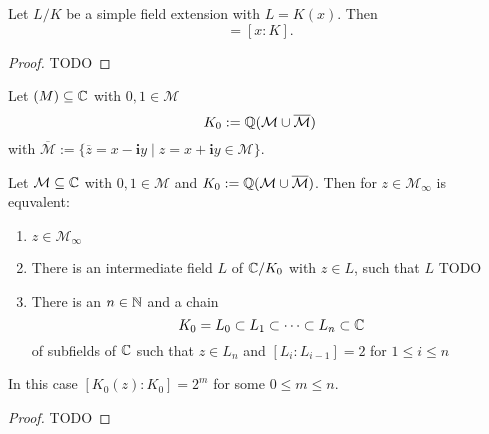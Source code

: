 \documentclass{../Proof_layout_PDF/TemplateExercise}
\begin{document}
\begin{theorem}
\label{thm:degree_of_simple_field_extension}
    Let $L/K$ be a simple field extension with $L = K(x)$. Then
    \begin{equation*}
        [L:K] = [x:K].
    \end{equation*}
\end{theorem}
\begin{proof}
    TODO %
\end{proof}
\begin{definition}
    Let $\mathcal(M)\subseteq\mathbb{C}$ with $0,1 \in \mathcal{M}$
    \begin{equation*}
        K_0 := \mathbb{Q}(\mathcal{M}\cup \overline{\mathcal{M}})
    \end{equation*}
    with $\overline{\mathcal{M}} := \{ \overline{z} = x - \textbf{i}y \mid z = x+\textbf{i}y  \in \mathcal{M} \}$.
\end{definition}
\begin{theorem}
\label{thm:degree_of_constructable_points}
    Let $\mathcal{M}\subseteq\mathbb{C}$ with $0,1 \in \mathcal{M}$ and $K_0 := \mathbb{Q}(\mathcal{M}\cup \overline{\mathcal{M}})$.
    Then for $z \in \mathcal{M}_{\infty}$ is equvalent:
    \begin{enumerate}
        \item $z \in \mathcal{M}_{\infty}$
        \item There is an intermediate field $L$ of $\mathbb{C}/K_0$ with $z \in L$, such that $L$
        TODO %
        \item There is an $n \in \mathbb{N}$ and a chain \begin{equation*}
            K_0 = L_0 \subset L_1 \subset \dots \subset L_n \subset \mathbb{C}
        \end{equation*}
        of subfields of $\mathbb{C}$ such that $z \in L_n$ and $[L_i:L_{i-1}] =2$ for $1\le i\le n$ %
    \end{enumerate}
    In this case $[K_0(z):K_0] = 2^m$ for some $0 \le m \le n$.
\end{theorem}
\begin{proof}
   TODO %
\end{proof}
\end{document}
